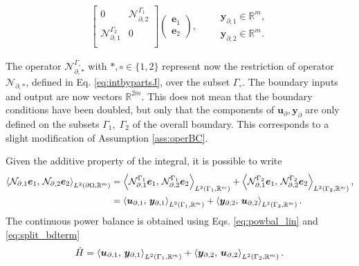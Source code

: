 \begin{subequations}
\begin{align}
\begin{bmatrix}
0 & \mathcal{N}_{\partial, 2}^{\Gamma_1} \\
\mathcal{N}_{\partial, 1}^{\Gamma_2} & 0\\
\end{bmatrix} \begin{pmatrix}
\bm{e}_1 \\ \bm{e}_2
\end{pmatrix}, \qquad
\begin{aligned}
\bm{y}_{\partial, 1} \in \mathbb{R}^{m},\\
\bm{y}_{\partial, 2} \in \mathbb{R}^{m}.
\end{aligned}
\end{align}
\end{subequations}

 The operator $\mathcal{N}_{\partial, *}^{\Gamma_\circ}$ with $*, \circ \in \{1, 2\}$ represent now the restriction of operator $\mathcal{N}_{\partial, *}$, defined in Eq. \eqref{eq:intbypartsJ}, over the subset $\Gamma_\circ$.  The boundary inputs and output are now vectors $\mathbb{R}^{2m}$. This does not mean that the boundary conditions have been doubled, but only that the components of $\bm{u}_\partial, \bm{y}_\partial$ are only defined on the subsets $\Gamma_1, \; \Gamma_2$ of the overall boundary. This corresponds to a slight modification of Assumption \ref{ass:operBC}.
 
 
Given the additive property of the integral, it is possible to write
\begin{equation}\label{eq:split_bdterm}
\begin{aligned}
\inner[L^2(\partial \Omega, \mathbb{R}^m)]{\mathcal{N}_{\partial, 1}\bm{e}_1}{\mathcal{N}_{\partial, 2}\bm{e}_2} &= \inner[L^2(\Gamma_1, \mathbb{R}^m)]{\mathcal{N}_{\partial, 1}^{\Gamma_1}\bm{e}_1}{\mathcal{N}_{\partial, 2}^{\Gamma_1}\bm{e}_2} + \inner[L^2({\Gamma_2, \mathbb{R}^m})]{\mathcal{N}_{\partial, 1}^{\Gamma_2}\bm{e}_1}{\mathcal{N}_{\partial, 2}^{\Gamma_2}\bm{e}_2}, \\
&= \inner[L^2({\Gamma_1, \mathbb{R}^m})]{\bm{u}_{\partial, 1}}{\bm{y}_{\partial, 1}} + \inner[L^2({\Gamma_2, \mathbb{R}^m})]{\bm{y}_{\partial, 2}}{\bm{u}_{\partial, 2}}.
\end{aligned} 
\end{equation}
The continuous power balance is obtained using Eqs. \eqref{eq:powbal_lin} and \eqref{eq:split_bdterm}
\begin{equation}\label{eq:powbal_mixed}
	\dot{H} = \inner[L^2({\Gamma_1}, \mathbb{R}^m)]{\bm{u}_{\partial, 1}}{\bm{y}_{\partial, 1}} + \inner[L^2({\Gamma_2}, \mathbb{R}^m)]{\bm{y}_{\partial, 2}}{\bm{u}_{\partial, 2}}.
\end{equation}
 


